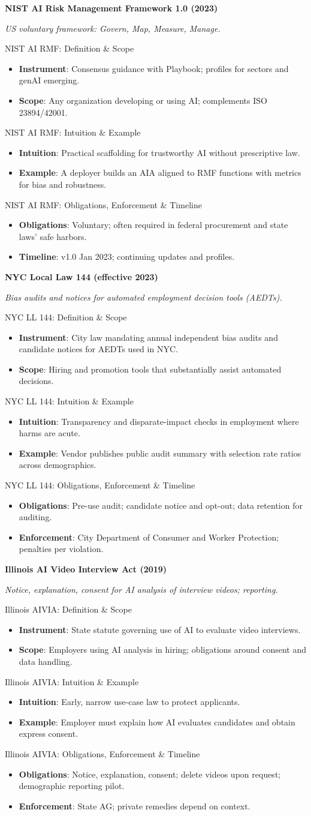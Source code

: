 \documentclass[aspectratio=169]{beamer}
\newcommand{\RegTitle}[2]{%
  \begin{frame}[plain]
    \centering
    \vfill
    {\usebeamerfont{title}\usebeamercolor[fg]{title}\LARGE \textbf{#1}\par}
    \vspace{0.4em}
    {\small \itshape #2\par}
    \vfill
  \end{frame}
}
\newcommand{\RegDef}[2]{%
  \begin{frame}{#1: Definition \& Scope}
    \begin{itemize}
      #2
    \end{itemize}
  \end{frame}
}
\newcommand{\RegIntuition}[2]{%
  \begin{frame}{#1: Intuition \& Example}
    \begin{itemize}
      #2
    \end{itemize}
  \end{frame}
}
\newcommand{\RegCompliance}[2]{%
  \begin{frame}{#1: Obligations, Enforcement \& Timeline}
    \begin{itemize}
      #2
    \end{itemize}
  \end{frame}
}
\begin{document}
\RegTitle{NIST AI Risk Management Framework 1.0 (2023)}{US voluntary framework: Govern, Map, Measure, Manage.}
\RegDef{NIST AI RMF}{%
  \item \textbf{Instrument}: Consensus guidance with Playbook; profiles for sectors and genAI emerging.
  \item \textbf{Scope}: Any organization developing or using AI; complements ISO 23894/42001.
}
\RegIntuition{NIST AI RMF}{%
  \item \textbf{Intuition}: Practical scaffolding for trustworthy AI without prescriptive law.
  \item \textbf{Example}: A deployer builds an AIA aligned to RMF functions with metrics for bias and robustness.
}
\RegCompliance{NIST AI RMF}{%
  \item \textbf{Obligations}: Voluntary; often required in federal procurement and state laws' safe harbors.
  \item \textbf{Timeline}: v1.0 Jan 2023; continuing updates and profiles.
}

\RegTitle{NYC Local Law 144 (effective 2023)}{Bias audits and notices for automated employment decision tools (AEDTs).}
\RegDef{NYC LL 144}{%
  \item \textbf{Instrument}: City law mandating annual independent bias audits and candidate notices for AEDTs used in NYC.
  \item \textbf{Scope}: Hiring and promotion tools that substantially assist automated decisions.
}
\RegIntuition{NYC LL 144}{%
  \item \textbf{Intuition}: Transparency and disparate-impact checks in employment where harms are acute.
  \item \textbf{Example}: Vendor publishes public audit summary with selection rate ratios across demographics.
}
\RegCompliance{NYC LL 144}{%
  \item \textbf{Obligations}: Pre-use audit; candidate notice and opt-out; data retention for auditing.
  \item \textbf{Enforcement}: City Department of Consumer and Worker Protection; penalties per violation.
}

\RegTitle{Illinois AI Video Interview Act (2019)}{Notice, explanation, consent for AI analysis of interview videos; reporting.}
\RegDef{Illinois AIVIA}{%
  \item \textbf{Instrument}: State statute governing use of AI to evaluate video interviews.
  \item \textbf{Scope}: Employers using AI analysis in hiring; obligations around consent and data handling.
}
\RegIntuition{Illinois AIVIA}{%
  \item \textbf{Intuition}: Early, narrow use-case law to protect applicants.
  \item \textbf{Example}: Employer must explain how AI evaluates candidates and obtain express consent.
}
\RegCompliance{Illinois AIVIA}{%
  \item \textbf{Obligations}: Notice, explanation, consent; delete videos upon request; demographic reporting pilot.
  \item \textbf{Enforcement}: State AG; private remedies depend on context.
}
\end{document}
